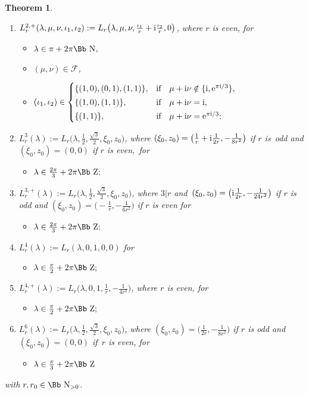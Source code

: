 \documentclass[10pt,a4paper]{amsart}
\newcommand\NN{{\mbox{\Bb N}}}
\newcommand\ZZ{{\mbox{\Bb Z}}}
\newcommand\cF{{\mathcal F}}
\numberwithin{equation}{section}
\newtheorem{Theorem}{Theorem}[section]
\begin{document}
\begin{Theorem}
\begin{enumerate}
\begin{itemize}
\item[$\circ$] $(\mu,\nu)\in\cF;$
\end{itemize}
%
\item[$3.$] $L^{2,+}_r(\lambda,\mu,\nu,\iota_1,\iota_2):= L_r\big(\lambda,\mu,\nu,\frac{\iota_1}{r}+{\rm i}\frac{\iota_2}{r},0\big)$, where $r$ is even, for
\begin{itemize}
\item[$\circ$] $\lambda\in\pi+2\pi\NN$,
\item[$\circ$] $(\mu,\nu)\in\cF$,
\item[$\circ$]
$(\iota_1,\iota_2)\in \begin{cases}	
\{(1,0),(0,1),(1,1)\}, &\text{if}\quad
\mu+{\rm i}\nu\notin\{{\rm i},{\rm e}^{\pi {\rm i}/3}\}, \\[0.5ex]
\{(1,0),(1,1)\}, &\text{if}\quad \mu+{\rm i}\nu={\rm i},\\[0.5ex]
\{(1,1)\} ,&\text{if}\quad \mu+{\rm i}\nu={\rm e}^{\pi {\rm i}/3};
\end{cases}$
\end{itemize}
%
\item[$4.$] $L^3_r(\lambda):=L_r\big(\lambda,\frac{1}{2},\frac{\sqrt{3}}{2},\xi_0,z_0\big)$, where $(\xi_0,z_0)=\big(\frac1r+{\rm i}\frac1{2r},-\frac{1}{8r^2}\big)$ if $r$ is~odd and $(\xi_0,z_0)=(0,0)$ if $r$ is even,~for
\begin{itemize}
\item[$\circ$]
$\lambda \in \frac {2\pi}3 +2\pi \ZZ;$
\end{itemize}
%
\item[$5.$] $L^{3,+}_r(\lambda):=L_r\big(\lambda,\frac{1}{2},\frac{\sqrt{3}}{2},\xi_0,z_0\big)$, where $3|r$ and~$(\xi_0,z_0)=\big({\rm i}\frac1{2r},-\frac{1}{24r^2}\big)$ if $r$ is odd
and $(\xi_0,z_0)=\big({-}\frac1r,-\frac{1}{6r^2}\big)$ if $r$ is even for
\begin{itemize}
\item[$\circ$]
$\lambda \in \frac {2\pi}3 +2\pi \ZZ;$
\end{itemize}
%
\item[$6.$] $L^4_r(\lambda):= L_r(\lambda,0,1,0,0)$ for
\begin{itemize}
\item[$\circ$] $\lambda \in \frac \pi2 +2\pi \ZZ;$
\end{itemize}
%
\item[$7.$] $L^{4,+}_r(\lambda):=L_r\big(\lambda,0,1,\frac1r,-\frac1{4r^2}\big)$, where $r$ is even, for
\begin{itemize}
\item[$\circ$]
$\lambda \in \frac \pi2 +2\pi \ZZ;$
\end{itemize}
%
\item[$8.$] $L^6_r(\lambda):=L_r\big(\lambda,\frac{1}{2},\frac{\sqrt{3}}{2},\xi_0,z_0\big)$, where $(\xi_0,z_0)=\big(\frac{1}{2r}, -\frac{1}{8r^2}\big)$ if $r$ is odd and $(\xi_0,z_0)=(0,0)$ if~$r$ is even, for
\begin{itemize}
\item[$\circ$]
$\lambda \in \frac \pi3 +2\pi \ZZ$
\end{itemize}
\end{enumerate}
with $r, r_0\in\NN_{>0}$.


\end{Theorem}
\end{document}
